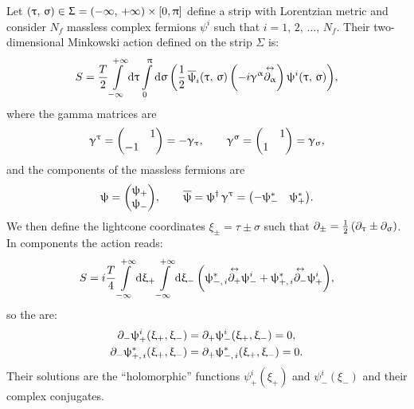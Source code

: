 Let $( \uptau,\, \upsigma ) \in \Upsigma = ( -\infty,\, +\infty) \times \qty[ 0, \uppi ]$ define a strip with Lorentzian metric and consider $N_f$ massless complex fermions $\psi^i$ such that $i = 1,\, 2,\, \dots,\, N_f$.
Their two-dimensional Minkowski action defined on the strip $\Sigma$ is:
\begin{equation}
  S
  =
  \frac{T}{2}
  \int\limits_{-\infty}^{+\infty} \dd{\ensuremath{\uptau}}
  \int\limits_{0}^{\uppi} \dd{\ensuremath{\upsigma}}
  \qty(
    \frac{1}{2}\, \overline{\uppsi}_i( \uptau,\, \upsigma )\,
    \qty( -i \upgamma^{\upalpha} \overset{\leftrightarrow}{\partial_{\upalpha}} )\,
    \uppsi^i( \uptau,\, \upsigma ) 
  ),
  \label{eq:cft-action_full}
\end{equation}
where the gamma matrices are
\begin{equation}
  \gamma^{\tau}
  =
  \mqty( & 1 \\ -1 & )
  =
  -\gamma_{\tau},
  \qquad
  \gamma^{\sigma}
  =
  \mqty( & 1 \\ 1 & )
  =
  \gamma_{\sigma},
\end{equation}
and the components of the massless fermions are
\begin{equation}
  \psi
  =
  \mqty( \psi_+ \\ \psi_- ),
  \qquad
  \bpsi
  =
  \psi^{\dagger}\, \gamma^{\tau}
  =
  \mqty( -\psi_-^* & \psi_+^* ).
\end{equation}
We then define the lightcone coordinates $\xi_{\pm} = \tau \pm \sigma$ such that $\partial_{\pm} = \frac{1}{2}\, \qty( \partial_{\uptau} \pm \partial_{\upsigma} )$.
In components the action reads:
\begin{equation}
  S
  =
  i \frac{T}{4}
  \infinfint{\xi_+}
  \infinfint{\xi_-}
  \qty(
    \psi^*_{-,\, i} \lripd{+} \psi^i_- + \psi^*_{+,\, i} \lripd{-} \psi^i_+
  ),
  \label{eq:cft-action}
\end{equation}
so the \eom are:
\begin{equation}
  \begin{split}
    \partial_{-} \uppsi_{+}^i( \upxi_+, \upxi_- )
    & =
    \partial_{+} \uppsi_{-}^i( \upxi_+, \upxi_- )
    =
    0,
    \\
    \partial_{-} \uppsi^*_{+,\, i}( \upxi_+, \upxi_- )
    & =
    \partial_{+} \uppsi^*_{-,\, i}( \upxi_+, \upxi_- )
    =
    0.
  \end{split}
  \label{eq:eom}
\end{equation}
Their solutions are the ``holomorphic'' functions $\psi_{+}^i(\xi_+)$ and $\psi_{-}^i(\xi_-)$ and their complex conjugates.\footnotemark{}
